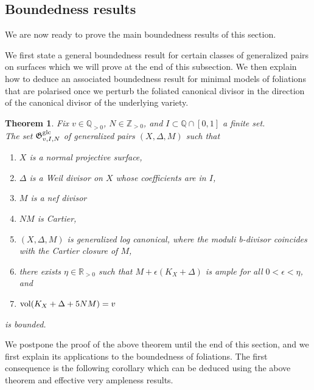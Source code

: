\documentclass[12pt, a4paper]{amsart}
\newcommand{\setgpairsdcc}[1]{\mathfrak G^{\rm g#1}_{v, I, N}}
\newcounter{Theorem}
\newtheorem{theorem}{Theorem}[section]
\theoremstyle{definition}
\theoremstyle{named}
\begin{document}
\subsection{Boundedness results}
We are now ready to prove the main boundedness results of this section.

We first state a general boundedness result for certain classes of generalized pairs on surfaces which we will prove at the end of this subsection.
We then explain how to deduce an associated boundedness result for minimal models of foliations that are polarised once we perturb the foliated canonical divisor in the direction of the canonical divisor of the underlying variety.


\begin{theorem}
\label{boundedness.glc.pairs.thm.finite.coeff}
Fix 
$v \in \mathbb Q_{>0}$, 
$N \in \mathbb Z_{>0}$, 
and 
$I \subset \mathbb Q \cap [0, 1]$
a finite set.
\\
The set
$\setgpairsdcc{lc}$
of generalized pairs
$(X,  \Delta, M)$ 
such that
\begin{enumerate}
\item 
\label{cond.normal.thm.bound}
$X$ 
is a normal projective surface, 
\item 
$\Delta$ 
is a Weil divisor on 
$X$ 
whose coefficients are in 
$I$,
\item 
$M$ is a nef divisor
 
\item
\label{cond.index.thm.bound}
$NM$ is Cartier, 
\item 
$(X, \Delta, M)$ is generalized log canonical,
where the moduli b-divisor coincides with the Cartier closure of $M$,  

\item 
\label{cond.nef.thm.bound}
there exists $\eta \in \mathbb R_{>0}$ such that 
$M+\epsilon (K_X+\Delta)$ is ample for all $0< \epsilon < \eta$, and
\item 
\label{cond.vol.thm.bound}
${\rm vol}(K_X+\Delta+5NM)=v$

\end{enumerate}
is bounded.
\end{theorem}




We postpone the proof of the above theorem until the end of this section, and we first explain its applications to the boundedness of foliations.
The first consequence is the following corollary which can be deduced using the above theorem and effective very ampleness results.
\end{document}
